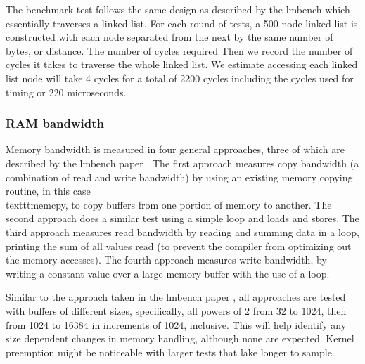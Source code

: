 \documentclass{article}
\begin{document}


The benchmark test follows the same design as described by the lmbench which essentially traverses a linked list. For each round of tests, a 500 node linked list is constructed with each node separated from the next by the same number of bytes, or distance. The number of cycles required Then we record the number of cycles it takes to traverse the whole linked list. We estimate accessing each linked list node will take 4 cycles for a total of 2200 cycles including the cycles used for timing or 220 microseconds.


\subsubsection{RAM bandwidth}
Memory bandwidth is measured in four general approaches, three of which are described by the lmbench paper \cite{lmbench}. The first approach measures copy bandwidth (a combination of read and write bandwidth) by using an existing memory copying routine, in this case \\texttt{memcpy}, to copy buffers from one portion of memory to another. The second approach does a similar test using a simple loop and loads and stores. The third approach measures read bandwidth by reading and summing data in a loop, printing the sum of all values read (to prevent the compiler from optimizing out the memory accesses). The fourth approach measures write bandwidth, by writing a constant value over a large memory buffer with the use of a loop.

Similar to the approach taken in the lmbench paper \cite{lmbench}, all approaches are tested with buffers of different sizes, specifically, all powers of 2 from 32 to 1024, then from 1024 to 16384 in increments of 1024, inclusive. This will help identify any size dependent changes in memory handling, although none are expected. Kernel preemption might be noticeable with larger tests that lake longer to sample.
\end{document}
